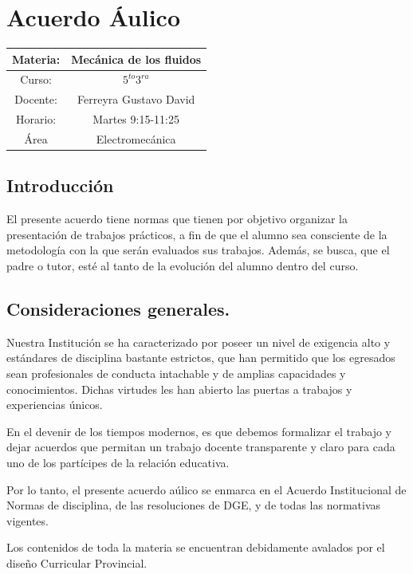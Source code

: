 \documentclass[../main]{subfiles}
\begin{document}
\chapter*{Acuerdo Áulico}


\begin{table}[h!]
    \centering
    \begin{tabular}{|c|c|} \hline 
Materia: & Mecánica de los fluidos \\ \hline
Curso: &$5^{to} 3^{ra}$ \\ \hline
Docente: & Ferreyra Gustavo David\\ \hline
Horario: &Martes 9:15-11:25 \\ \hline
Área & Electromecánica \\ \hline
    \end{tabular}
\end{table}
 

\section{Introducción} 

El presente acuerdo tiene normas que tienen por objetivo organizar la presentación de trabajos prácticos, a fin de que el alumno sea consciente de la metodología con la que serán evaluados sus trabajos. Además, se busca, que el padre o tutor, esté al tanto de la evolución del alumno dentro del curso. 

\section{Consideraciones generales.} 

Nuestra Institución se ha caracterizado por poseer un nivel de exigencia alto y estándares de disciplina bastante estrictos, que han permitido que los egresados sean profesionales de conducta intachable y de amplias capacidades y conocimientos. Dichas virtudes les han abierto las puertas a trabajos y experiencias únicos.  

En el devenir de los tiempos modernos, es que debemos formalizar el trabajo y dejar acuerdos que permitan un trabajo docente transparente y claro para cada uno de los partícipes de la relación educativa. 

Por lo tanto, el presente acuerdo aúlico se enmarca en el Acuerdo Institucional de Normas de disciplina, de las resoluciones de DGE, y de todas las normativas vigentes. 

Los contenidos de toda la materia se encuentran debidamente avalados por el diseño Curricular Provincial.  
\end{document}
